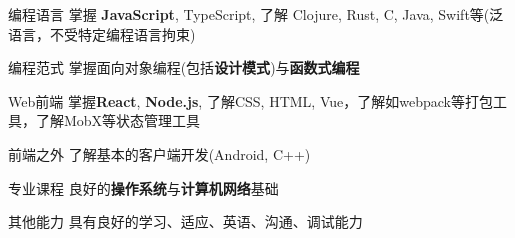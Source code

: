 

\begin{cvskills}

    \cvskill
    {编程语言} %
    {掌握 \textbf{JavaScript}, TypeScript, 了解 Clojure, Rust, C, Java, Swift等(泛语言，不受特定编程语言拘束)} %

    \cvskill
    {编程范式} %
    {掌握面向对象编程(包括\textbf{设计模式})与\textbf{函数式编程}} %

    \cvskill
    {Web前端} %
    {掌握\textbf{React}, \textbf{Node.js}, 了解CSS, HTML, Vue，了解如webpack等打包工具，了解MobX等状态管理工具} %

    \cvskill
    {前端之外} %
    {了解基本的客户端开发(Android, C++)} %

    \cvskill
    {专业课程} %
    {良好的\textbf{操作系统}与\textbf{计算机网络}基础} %

    \cvskill
    {其他能力} %
    {具有良好的学习、适应、英语、沟通、调试能力}

\end{cvskills}

